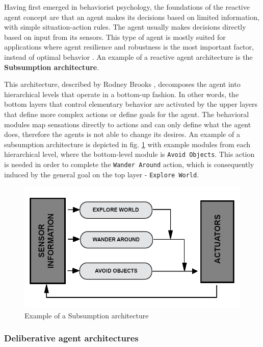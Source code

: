 \documentclass[0main.tex]{subfiles}
\begin{document}
Having first emerged in behaviorist psychology, the foundations of the reactive agent concept are
that an agent makes its decisions based on limited information, with simple situation-action rules. The agent
usually makes decisions directly based on input from its sensors. This type of agent is mostly
suited for applications where agent resilience and robustness is the most important factor, instead
of optimal behavior \cite{Anthony2014}. An example of a reactive agent architecture is the
\textbf{Subsumption architecture}.

This architecture, described by Rodney Brooks \cite{1087032},
decomposes the agent into hierarchical levels that operate in a bottom-up
fashion. In other words, the bottom layers that control elementary behavior are
activated by the upper layers that define more complex actions or define goals for
the agent. The behavioral modules map sensations
directly to actions and can only define what the agent does, therefore the agents is not able to
change its desires. An example of a subsumption architecture is depicted in fig.
\ref{Subsumption} with example modules from each hierarchical level, where the
bottom-level module is \texttt{Avoid Objects}. This action is needed in order
to complete the \texttt{Wander Around} action, which is consequently induced by the
general goal on the top layer - \texttt{Explore World}.

\begin{figure}[htbp]
    \centering
    \includegraphics[width = .8\textwidth]{Subsumption_Architecture_Abstract_Diagram-unified.png}
    \caption{Example of a Subsumption architecture}
    \label{Subsumption}
\end{figure}

\subsubsection{Deliberative agent architectures}
\end{document}
